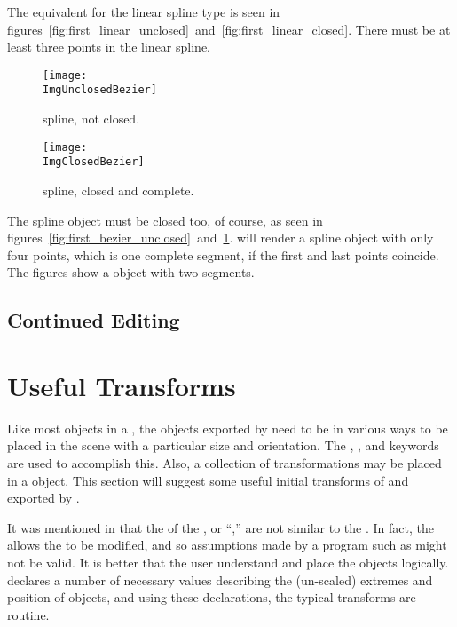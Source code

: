 		The equivalent for the linear spline type is seen in
		figures~\ref{fig:first_linear_unclosed}~and~\ref{fig:first_linear_closed}.
		There must be at least three points in the linear spline.		

		\begin{figure}[htbp]
		\centering
		\texttt{[image: \\ImgUnclosedBezier]}
		\caption{\dtybezieru{} spline, not closed.}
		\label{fig:first_bezier_unclosed}
		\vspace{16pt}
		\texttt{[image: \\ImgClosedBezier]}
		\caption{\dtybezieru{} spline, closed and complete.}
		\label{fig:first_bezier_closed}
		\end{figure}

		The \dtybezierl{} spline object must be closed too, of course,
		as seen in
		figures~\ref{fig:first_bezier_unclosed}~and~\ref{fig:first_bezier_closed}.
		\IXpov{} will render a \dtybezierl{} spline object with only
		four points, which is one complete segment, if the first
		and last points coincide.
		The figures show a \dtybezierl{} object
		with two segments.


		\subsection{Continued Editing}%
		\label{ssec:cont_editing}


	\section{Useful Transforms}%
	\label{sec:useful_transforms}
	Like most objects in a \IXpov{} ,
	the objects exported by \IXpkg{} need to be
	 in various ways to be
	placed in the scene with a particular size and
	orientation. The ,
	, and
	 keywords are used to
	accomplish this. Also, a collection of transformations
	may be placed in a  object.
	This section will suggest some useful initial transforms
	of  and  exported
	by \IXpkg{}.
	
	It was mentioned in 
	that the  of the \IXpkg{}
	, or ``,''
	are not similar to the \IXpov{}
	. In fact, the 
	allows the \IXpov{} 
	to be modified, and so assumptions made by a program
	such as \IXpkg{} might not be valid. It is better that
	the user understand \IXpov{}  and
	place the objects logically. \IXpkgu{} declares a number
	of necessary values describing the (un-scaled) extremes
	and position of objects, and using these declarations,
	the typical transforms are routine.

